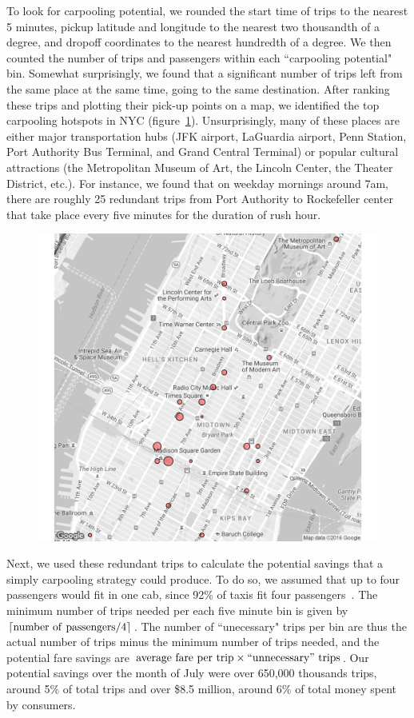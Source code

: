 \documentclass[twocolumn]{article}
\DeclarePairedDelimiter{\ceil}{\lceil}{\rceil}
\begin{document}
To look for carpooling potential, we rounded the start time of trips to the nearest 5 minutes, pickup latitude and longitude to the nearest two thousandth of a degree, and dropoff coordinates to the nearest hundredth of a degree. We then counted the number of trips and passengers within each ``carpooling potential" bin. Somewhat surprisingly, we found that a significant number of trips left from the same place at the same time, going to the same destination. After ranking these trips and plotting their pick-up points on a map, we identified the top carpooling hotspots in NYC (figure~\ref{fig:hotspots}). Unsurprisingly, many of these places are either major transportation hubs (JFK airport, LaGuardia airport, Penn Station, Port Authority Bus Terminal, and Grand Central Terminal) or popular cultural attractions (the Metropolitan Museum of Art, the Lincoln Center, the Theater District, etc.). For instance, we found that on weekday mornings around 7am, there are roughly 25 redundant trips from Port Authority to Rockefeller center that take place every five minutes for the duration of rush hour.
\begin{figure}[t]
  \centering
  \includegraphics[width=.9\linewidth]{top_25_hotspots}
  \label{fig:hotspots}
\end{figure}

Next, we used these redundant trips to calculate the potential savings that a simply carpooling strategy could produce. To do so, we assumed that up to four passengers would fit in one cab, since 92\% of taxis fit four passengers~\cite{TLC:2007}. The minimum number of trips needed per each five minute bin is given by $\ceil{\mathrm{number~of~passengers} / 4}$. The number of ``unecessary" trips per bin are thus the actual number of trips minus the minimum number of trips needed, and the potential fare savings are $\mathrm{average~fare~per~trip}\times\mathrm{``unnecessary"~trips}$. Our potential savings over the month of July were over 650,000 thousands trips, around 5\% of total trips and over \$8.5 million, around 6\% of total money spent by consumers.
\end{document}
